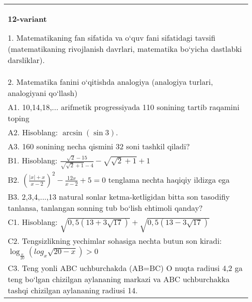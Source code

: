 \documentclass{article}
\begin{document}
\begin{tabular}{m{17cm}}
\textbf{12-variant}

1. Matematikaning fan sifatida va o‘quv fani sifatidagi tavsifi (matematikaning rivojlanish davrlari, matematika bo‘yicha dastlabki darsliklar). \\
2. Matematika fanini o‘qitishda analogiya (analogiya turlari, analogiyani qo‘llash) \\
A1. 10,14,18,... arifmetik progressiyada 110 sonining tartib raqamini toping \\
A2. Hisoblang: \(\arcsin (\sin3) \). \\
A3. 160 sonining necha qismini 32 soni tashkil qiladi? \\
B1. Hisoblang: \(\frac{\sqrt{2} - 15}{\sqrt{\sqrt{2} + 1} - 4} - \sqrt{\sqrt{2} + 1} + 1\) \\
B2. $ (\frac{|x| + x}{x-2}) ^{2} - \frac{12x}{x-2} + 5 = 0$ tenglama nechta haqiqiy ildizga ega \\
B3. 2,3,4,...,13 natural sonlar ketma-ketligidan bitta son tasodifiy tanlansa, tanlangan sonning tub bo‘lish ehtimoli qanday? \\
C1. Hisoblang: \(\sqrt{0,5 (13 + 3\sqrt{17}) } + \sqrt{0,5 (13 - 3\sqrt{17}) }\) \\
C2. Tengsizlikning yechimlar sohasiga nechta butun son kiradi: \(\log_{\frac{x}{20}} (log_{x}\sqrt{20 - x}) > 0\) \\
C3. Teng yonli ABC uchburchakda (AB=BC) O nuqta radiusi 4,2 ga teng bo‘lgan chizilgan aylananing markazi va ABC uchburchakka tashqi chizilgan aylananing radiusi 14. \\

\end{tabular}
\vspace{1cm}
\end{document}

